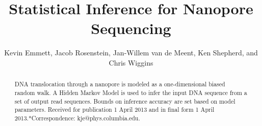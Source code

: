 \documentclass{biophys_letter}
\begin{document}

\setcounter{page}{1} %
\title{Statistical Inference for Nanopore Sequencing}

\author{Kevin Emmett,{\authdagger} Jacob Rosenstein, Jan-Willem van de Meent, Ken Shepherd, and Chris Wiggins}

\address{{\addrdagger}Department of Physics and Department of Applied Physics and Applied Math, Columbia University, New York, New York; and Department of Mechanical Engineering, Brown University, Providence, Rhode Island}

\maketitle

\pagestyle{headings}



\begin{abstract}
{DNA translocation through a nanopore is modeled as a one-dimensional biased random walk. A Hidden Markov Model is used to infer the input DNA sequence from a set of output read sequences. Bounds on inference accuracy are set based on model parameters.}
{Received for publication 1 April 2013 and in final form 1 April 2013.}{*Correspondence: kje@phys.columbia.edu.}
\end{abstract}
\end{document}
